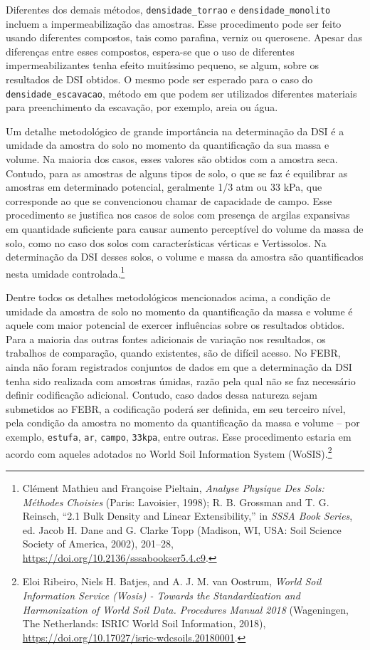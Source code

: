 \documentclass[
  a4paper,
  dvipsnames]{tufte-book}
\begin{document}
Diferentes dos demais métodos, \texttt{densidade\_torrao} e \texttt{densidade\_monolito} incluem a impermeabilização das amostras. Esse procedimento pode ser feito usando diferentes compostos, tais como parafina, verniz ou querosene. Apesar das diferenças entre esses compostos, espera-se que o uso de diferentes impermeabilizantes tenha efeito muitíssimo pequeno, se algum, sobre os resultados de DSI obtidos. O mesmo pode ser esperado para o caso do \texttt{densidade\_escavacao}, método em que podem ser utilizados diferentes materiais para preenchimento da escavação, por exemplo, areia ou água.

Um detalhe metodológico de grande importância na determinação da DSI é a umidade da amostra do solo no momento da quantificação da sua massa e volume. Na maioria dos casos, esses valores são obtidos com a amostra seca. Contudo, para as amostras de alguns tipos de solo, o que se faz é equilibrar as amostras em determinado potencial, geralmente 1/3 atm ou 33 kPa, que corresponde ao que se convencionou chamar de capacidade de campo. Esse procedimento se justifica nos casos de solos com presença de argilas expansivas em quantidade suficiente para causar aumento perceptível do volume da massa de solo, como no caso dos solos com características vérticas e Vertissolos. Na determinação da DSI desses solos, o volume e massa da amostra são quantificados nesta umidade controlada.\footnote{Clément Mathieu and Françoise Pieltain, \emph{Analyse Physique Des Sols: Méthodes Choisies} (Paris: Lavoisier, 1998); R. B. Grossman and T. G. Reinsch, ``2.1 Bulk Density and Linear Extensibility,'' in \emph{SSSA Book Series}, ed. Jacob H. Dane and G. Clarke Topp (Madison, WI, USA: Soil Science Society of America, 2002), 201--28, \url{https://doi.org/10.2136/sssabookser5.4.c9}.}

Dentre todos os detalhes metodológicos mencionados acima, a condição de umidade da amostra de solo no momento da quantificação da massa e volume é aquele com maior potencial de exercer influências sobre os resultados obtidos. Para a maioria das outras fontes adicionais de variação nos resultados, os trabalhos de comparação, quando existentes, são de difícil acesso. No FEBR, ainda não foram registrados conjuntos de dados em que a determinação da DSI tenha sido realizada com amostras úmidas, razão pela qual não se faz necessário definir codificação adicional. Contudo, caso dados dessa natureza sejam submetidos ao FEBR, a codificação poderá ser definida, em seu terceiro nível, pela condição da amostra no momento da quantificação da massa e volume -- por exemplo, \texttt{estufa}, \texttt{ar}, \texttt{campo}, \texttt{33kpa}, entre outras. Esse procedimento estaria em acordo com aqueles adotados no World Soil Information System (WoSIS).\footnote{Eloi Ribeiro, Niels H. Batjes, and A. J. M. van Oostrum, \emph{World Soil Information Service (Wosis) - Towards the Standardization and Harmonization of World Soil Data. Procedures Manual 2018} (Wageningen, The Netherlands: ISRIC World Soil Information, 2018), \url{https://doi.org/10.17027/isric-wdcsoils.20180001}.}
\end{document}
